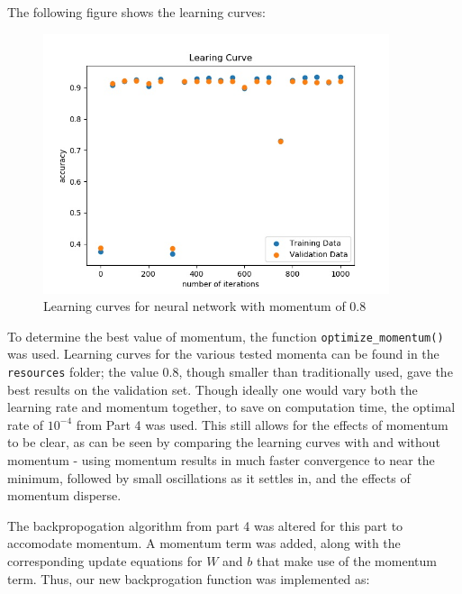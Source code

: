 \documentclass{article}
\begin{document}
   The following figure shows the learning curves:
      \begin{figure}[H] \centering
         \includegraphics[width=4in]{resources/part5}
         \caption{Learning curves for neural network  with momentum of 0.8}
      \end{figure}

  To determine the best value of momentum, the function \texttt{optimize\_momentum()} was used.
  Learning curves for the various tested momenta can be found in the \texttt{resources} folder;
  the value 0.8, though smaller than traditionally used, gave the best results on the validation set.
  Though ideally one would vary both the learning rate and momentum together, to save on
  computation time, the optimal rate of $10^{-4}$ from Part 4 was used. This still allows for
  the effects of momentum to be clear, as can be seen by comparing the learning curves with and
  without momentum - using momentum results in much faster convergence to near the minimum, followed
  by small oscillations as it settles in, and the effects of momentum disperse.

  The backpropogation algorithm from part 4 was altered for this part to accomodate momentum.
  A momentum term was added, along with  the corresponding update equations
  for $W$ and $b$ that make use of the momentum term.
  Thus, our new backprogation function was implemented as:
\end{document}

